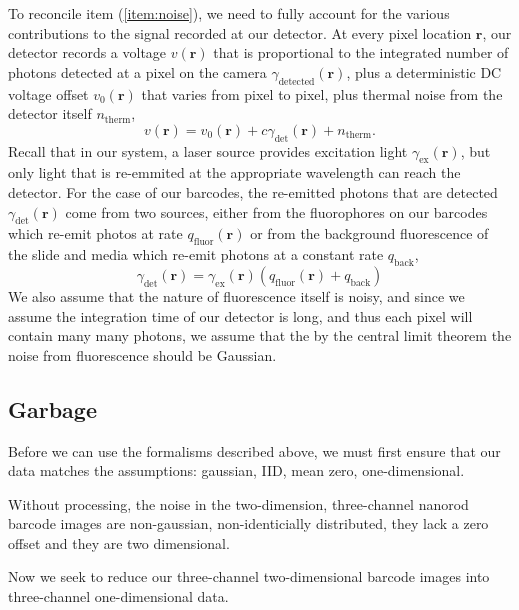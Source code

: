 To reconcile item (\ref{item:noise}), we need to fully account for the various contributions to the signal recorded at our detector. At every pixel location $\mathbf{r}$, our detector records a voltage $v(\mathbf{r})$  that is proportional to the integrated number of photons detected at a pixel on the camera $\gamma_{\text{detected}}(\mathbf{r})$, plus a deterministic DC voltage offset $v_0(\mathbf{r})$ that varies from pixel to pixel, plus thermal noise from the detector itself $n_{\text{therm}}$,
\begin{equation}
v(\mathbf{r})=v_0(\mathbf{r})+c\gamma_{\text{det}}(\mathbf{r}) +n_{\text{therm}}.
\end{equation}
Recall that in our system, a laser source provides excitation light $\gamma_{\text{ex}}(\mathbf{r})$, but only light that is re-emmited at the appropriate wavelength can reach the detector.  For the case of our barcodes, the re-emitted photons that are detected $\gamma_{\text{det}}(\mathbf{r})$ come from two sources, either from the fluorophores on our barcodes which re-emit photos at rate $q_{\text{fluor}}(\mathbf{r})$  or from the background fluorescence of the slide and media which re-emit photons at a constant rate $q_{\text{back}}$,
\begin{equation}
\gamma_{\text{det}}(\mathbf{r})=  \gamma_{\text{ex}}(\mathbf{r}) \left( q_{\text{fluor}}(\mathbf{r}) +q_{\text{back}}\right)
\end{equation}
We also assume that the nature of fluorescence itself is noisy, and since we assume the integration time of our detector is long, and thus each pixel will contain many many photons, we assume that the by the central limit theorem the noise from fluorescence should be Gaussian.


\subsection{Garbage	} 



Before we can use the formalisms described above, we must first ensure that our data matches the assumptions: gaussian, IID, mean zero, one-dimensional. 

Without processing, the noise in the two-dimension, three-channel nanorod barcode images are non-gaussian, non-identicially distributed, they lack a zero offset and they are two dimensional.



Now we seek to reduce our three-channel two-dimensional barcode images into three-channel one-dimensional data. 



